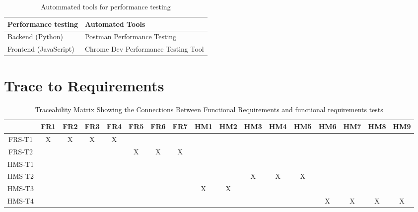 \documentclass[12pt, oneside, openany, titlepage]{article}
\begin{document}
\begin{table}[!h]
    \centering
    \begin{tabular}{p{}|p{}}
    \hline
        \textbf{Performance testing} & \textbf{Automated Tools} \\ \hline
        Backend (Python) & Postman Performance Testing \\ \hline
        Frontend (JavaScript) & Chrome Dev Performance Testing Tool\\ \hline
    \end{tabular}
    \caption{Autommated tools for performance testing}
\end{table}	

\section{Trace to Requirements} 
\begin{landscape}
\begin{table}[h!]
\centering
\begin{tabular}{|c|c|c|c|c|c|c|c|c|c|c|c|c|c|c|c|c|}
\hline
	& FR1 & FR2 & FR3 & FR4 & FR5 & FR6 & FR7 & HM1 & HM2 & HM3 & HM4 & HM5 & HM6 & HM7 & HM8 & HM9 \\
\hline
FRS-T1        & X& X& X& X& & & & & & & & & & & & \\ \hline
FRS-T2        & & & & & X& X& X& & & & & & & & &  \\ \hline
HMS-T1        & & & & & & & & & & & & & & & & \\ \hline
HMS-T2        & & & & & & & & & & X& X& X& & & & \\ \hline
HMS-T3        & & & & & & & & X& X& & & & & & & \\ \hline
HMS-T4        & & & & & & & & & & & & & X& X& X&X \\ \hline

\end{tabular}
\caption{Traceability Matrix Showing the Connections Between Functional Requirements and functional requirements tests}
\label{Table:A_trace}
\end{table}
\end{landscape}
\end{document}
